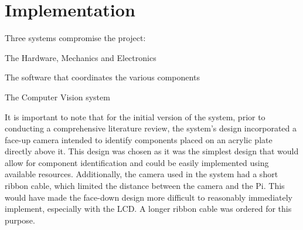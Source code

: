 \section{Implementation} \label{sec:implementation}
Three systems compromise the project:
\begin{mylist}
  \item The Hardware, Mechanics and Electronics
  \item The software that coordinates the various components
  \item The Computer Vision system
\end{mylist}

\noindent
It is important to note that for the initial version of the system, prior to conducting a comprehensive literature review,
the system's design incorporated a face-up camera intended to identify components placed on an acrylic plate directly above it.
This design was chosen as it was the simplest design that would allow for component identification and could 
be easily implemented using available resources. Additionally, the camera used in the system had 
a short ribbon cable, which limited the distance between the camera and the Pi. This would have made the face-down
design more difficult to reasonably immediately implement, especially with the LCD. A longer ribbon cable was ordered
for this purpose.

